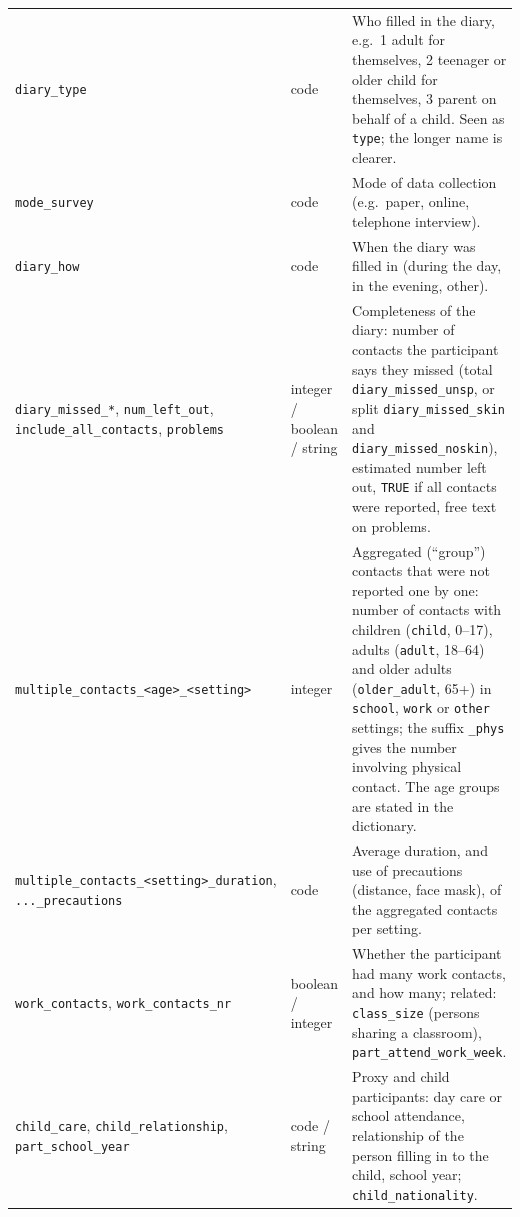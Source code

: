 \documentclass[11pt,a4paper]{article}
\begin{document}
{\begin{longtable}{p{3.4cm} p{1.8cm} p{8.2cm}}
    \texttt{diary\_\allowbreak{}type} & code & Who filled in the diary, e.g.\ 1 adult for themselves, 2 teenager or older child for themselves, 3 parent on behalf of a child. Seen as \texttt{type}; the longer name is clearer. \\
    \texttt{mode\_\allowbreak{}survey} & code & Mode of data collection (e.g.\ paper, online, telephone interview). \\
    \texttt{diary\_\allowbreak{}how} & code & When the diary was filled in (during the day, in the evening, other). \\
    \texttt{diary\_\allowbreak{}missed\_\allowbreak{}*}, \texttt{num\_\allowbreak{}left\_\allowbreak{}out}, \texttt{include\_\allowbreak{}all\_\allowbreak{}contacts}, \texttt{problems} & integer / boolean / string & Completeness of the diary: number of contacts the participant says they missed (total \texttt{diary\_\allowbreak{}missed\_\allowbreak{}unsp}, or split \texttt{diary\_\allowbreak{}missed\_\allowbreak{}skin} and \texttt{diary\_\allowbreak{}missed\_\allowbreak{}noskin}), estimated number left out, \texttt{TRUE} if all contacts were reported, free text on problems. \\
    \texttt{multiple\_\allowbreak{}contacts\_\allowbreak{}<age>\_\allowbreak{}<setting>} & integer & Aggregated (``group'') contacts that were not reported one by one: number of contacts with children (\texttt{child}, 0--17), adults (\texttt{adult}, 18--64) and older adults (\texttt{older\_\allowbreak{}adult}, 65+) in \texttt{school}, \texttt{work} or \texttt{other} settings; the suffix \texttt{\_\allowbreak{}phys} gives the number involving physical contact. The age groups are stated in the dictionary. \\
    \texttt{multiple\_\allowbreak{}contacts\_\allowbreak{}<setting>\_\allowbreak{}duration}, \texttt{...\_\allowbreak{}precautions} & code & Average duration, and use of precautions (distance, face mask), of the aggregated contacts per setting. \\
    \texttt{work\_\allowbreak{}contacts}, \texttt{work\_\allowbreak{}contacts\_\allowbreak{}nr} & boolean / integer & Whether the participant had many work contacts, and how many; related: \texttt{class\_\allowbreak{}size} (persons sharing a classroom), \texttt{part\_\allowbreak{}attend\_\allowbreak{}work\_\allowbreak{}week}. \\
    \texttt{child\_\allowbreak{}care}, \texttt{child\_\allowbreak{}relationship}, \texttt{part\_\allowbreak{}school\_\allowbreak{}year} & code / string & Proxy and child participants: day care or school attendance, relationship of the person filling in to the child, school year; \texttt{child\_\allowbreak{}nationality}. \\

\end{longtable}}
\end{document}
